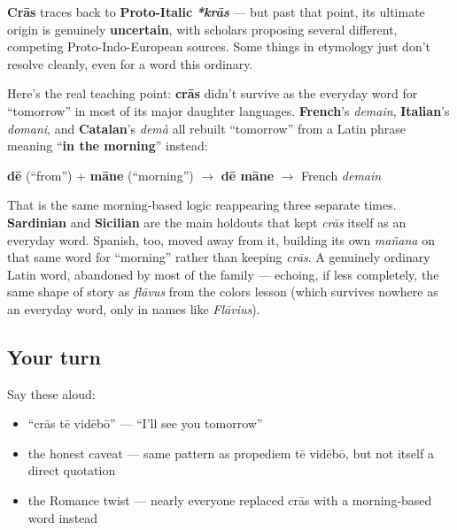 \begin{cousinweb}
\textbf{Crās} traces back to \textbf{Proto-Italic} \emph{\textbf{*krās}} — but past that point, its ultimate origin is genuinely \textbf{uncertain}, with scholars proposing several different, competing Proto-Indo-European sources. Some things in etymology just don't resolve cleanly, even for a word this ordinary.
\end{cousinweb}

\begin{culture}
Here's the real teaching point: \textbf{crās} didn't survive as the everyday word for \textquotedblleft{}tomorrow\textquotedblright{} in most of its major daughter languages. \textbf{French}'s \emph{demain}, \textbf{Italian}'s \emph{domani}, and \textbf{Catalan}'s \emph{demà} all rebuilt \textquotedblleft{}tomorrow\textquotedblright{} from a Latin phrase meaning \textquotedblleft{}\textbf{in the morning}\textquotedblright{} instead:

\textbf{dē} (\textquotedblleft{}from\textquotedblright{}) + \textbf{māne} (\textquotedblleft{}morning\textquotedblright{}) $\to$ \textbf{dē māne} $\to$ French \emph{demain}

That is the same morning-based logic reappearing three separate times. \textbf{Sardinian} and \textbf{Sicilian} are the main holdouts that kept \emph{crās} itself as an everyday word. Spanish, too, moved away from it, building its own \emph{mañana} on that same word for \textquotedblleft{}morning\textquotedblright{} rather than keeping \emph{crās}. A genuinely ordinary Latin word, abandoned by most of the family — echoing, if less completely, the same shape of story as \emph{flāvus} from the colors lesson (which survives nowhere as an everyday word, only in names like \emph{Flāvius}).
\end{culture}

\subsection*{Your turn}
Say these aloud:

\begin{itemize}
\raggedright
  \item \textquotedblleft{}crās tē vidēbō\textquotedblright{} — \textquotedblleft{}I'll see you tomorrow\textquotedblright{}
  \item the honest caveat — same pattern as propediem tē vidēbō, but not itself a direct quotation
  \item the Romance twist — nearly everyone replaced crās with a morning-based word instead
\end{itemize}

